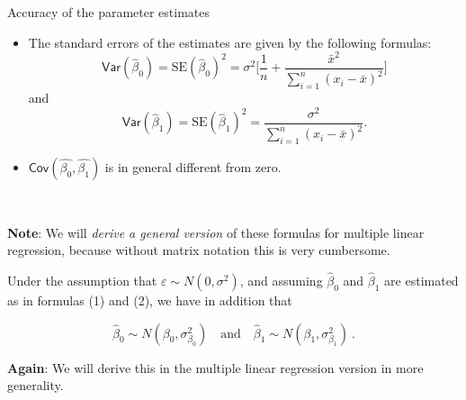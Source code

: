 \documentclass[10pt,ignorenonframetext,]{beamer}
\begin{document}
\begin{frame}

\begin{block}{Accuracy of the parameter estimates}

\vspace{2mm}

\begin{itemize}
\item
  The standard errors of the estimates are given by the following
  formulas:
  \[\mathsf{Var}(\hat{\beta}_0)=\text{SE}(\hat{\beta}_0)^2 = \sigma^2 \Big [ \frac{1}{n} + \frac{\bar{x}^2}{\sum_{i=1}^n (x_i -\bar{x})^2} \Big]\]
  and
  \[\mathsf{Var}(\hat{\beta}_1)=\text{SE}(\hat{\beta}_1)^2 = \frac{\sigma^2}{\sum_{i=1}^n (x_i-\bar{x})^2}.\]
\item
  \(\mathsf{Cov}(\hat{\beta_0},\hat{\beta_1})\) is in general different
  from zero.
\end{itemize}

\(~\) \(~\)

\textbf{Note}: We will \emph{derive a general version} of these formulas
for multiple linear regression, because without matrix notation this is
very cumbersome.

\end{block}

\end{frame}

\begin{frame}

Under the assumption that \(\varepsilon \sim N(0,\sigma^2)\), and
assuming \(\hat\beta_0\) and \(\hat\beta_1\) are estimated as in
formulas (1) and (2), we have in addition that

\[
 \hat\beta_0 \sim N(\beta_0,{\sigma^{2}_{\beta_0}}) \quad \text{and} \quad \hat\beta_1 \sim N(\beta_1,{\sigma^{2}_{\beta_1}}) \ .
\]

\vspace{6mm}

\textbf{Again}: We will derive this in the multiple linear regression
version in more generality.

\end{frame}
\end{document}
